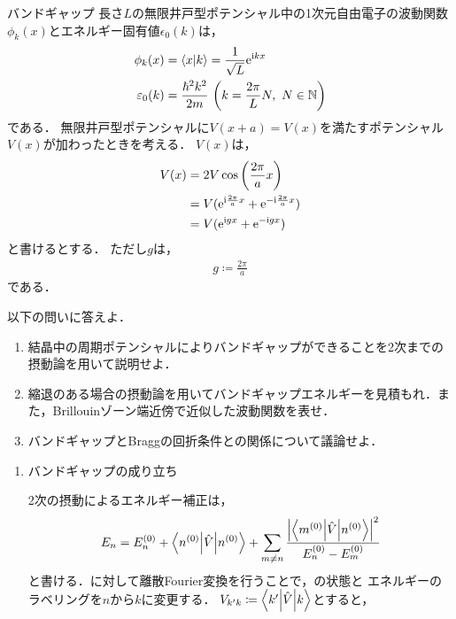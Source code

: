 \documentclass{report}
\begin{document}
  \begin{myex}{バンドギャップ}{}
    長さ$L$の無限井戸型ポテンシャル中の1次元自由電子の波動関数$\phi_k(x)$とエネルギー固有値$\epsilon_0(k)$は，
    \begin{align}
      \phi_k(x) &= \braket{x}{k} = \frac{1}{\sqrt{L}}\mathrm{e}^{\mathrm{i} kx} \\ 
      \varepsilon_0(k) &= \frac{\hbar^2k^2}{2m}\ \qty(k = \frac{2\pi}{L}N,\ N\in\mathbb{N})
    \end{align}
    である．
    無限井戸型ポテンシャルに$V(x + a) = V(x)$を満たすポテンシャル$V(x)$が加わったときを考える．
    $V(x)$は，
    \begin{align}
      V(x)& = 2V\cos\qty(\frac{2\pi}{a}x)\\
      & = V(\mathrm{e}^{\mathrm{i}\frac{2\pi}{a}x} + \mathrm{e}^{-\mathrm{i}\frac{2\pi}{a}x})\\
      & = V(\mathrm{e}^{\mathrm{i} gx} + \mathrm{e}^{-\mathrm{i} gx})
    \end{align}
    と書けるとする．
    ただし$g$は，
    \begin{align}
      g\coloneqq \frac{2\pi}{a}\label{wave-number-g-def}
    \end{align}
    である．
    \par
    以下の問いに答えよ．
    \begin{enumerate}
      \item 結晶中の周期ポテンシャルによりバンドギャップができることを2次までの摂動論を用いて説明せよ．
      \item 縮退のある場合の摂動論を用いてバンドギャップエネルギーを見積もれ．また，Brillouinゾーン端近傍で近似した波動関数を表せ．
      \item バンドギャップとBraggの回折条件との関係について議論せよ．
    \end{enumerate}
    \tcblower
    \begin{enumerate}
      \item バンドギャップの成り立ち \par
        2次の摂動によるエネルギー補正は，
        \begin{align}
          E_n = E_n^{(0)} + \mel**{n^{(0)}}{\hat{V}}{n^{(0)}} + \sum_{m\neq n}\frac{\abs{\mel**{m^{(0)}}{\hat{V}}{n^{(0)}}}^2}{E_n^{(0)} - E_m^{(0)}} \label{2nd-order-perturbation-eigenvalue-re}
        \end{align}
        と書ける．に対して離散Fourier変換を行うことで，の状態と
        エネルギーのラベリングを$n$から$k$に変更する．
        $V_{k'k} \coloneqq \mel**{k'}{\hat{V}}{k}$とすると，

\end{enumerate}
\end{myex}
\end{document}
